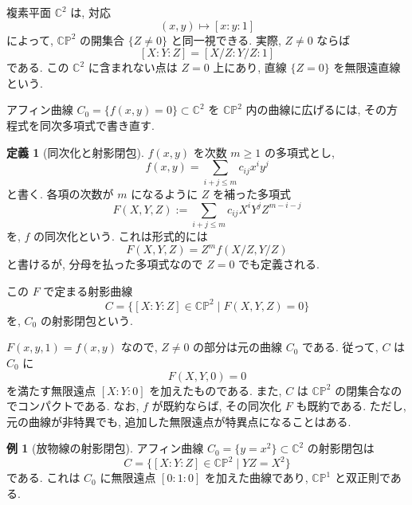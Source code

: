 \documentclass[dvipdfmx,a4paper,11pt]{article} %
\newcommand{\C}{\mathbb{C}}
\theoremstyle{definition}
\numberwithin{equation}{section}
\newtheorem{dfn}[thm]{定義}
\newtheorem{exa}[thm]{例}
\begin{document}
複素平面 $\C^2$ は, 対応
\[
(x,y)\longmapsto[x:y:1]
\]
によって, $\C\mathbb P^2$ の開集合 $\{Z\neq0\}$ と同一視できる.
実際, $Z\neq0$ ならば
\[
[X:Y:Z]=[X/Z:Y/Z:1]
\]
である.
この $\C^2$ に含まれない点は $Z=0$ 上にあり, 
直線 $\{Z=0\}$ を無限遠直線という.

アフィン曲線 $C_0=\{f(x,y)=0\}\subset\C^2$ を
$\C\mathbb P^2$ 内の曲線に広げるには, 
その方程式を同次多項式で書き直す.

\begin{dfn}[同次化と射影閉包]
$f(x,y)$ を次数 $m\geq1$ の多項式とし, 
\[
f(x,y)=\sum_{i+j\leq m}c_{ij}x^iy^j
\]
と書く.
各項の次数が $m$ になるように $Z$ を補った多項式
\[
F(X,Y,Z)
:=\sum_{i+j\leq m}c_{ij}X^iY^jZ^{m-i-j}
\]
を, $f$ の同次化という.
これは形式的には
\[
F(X,Y,Z)=Z^m f(X/Z,Y/Z)
\]
と書けるが, 分母を払った多項式なので $Z=0$ でも定義される.

この $F$ で定まる射影曲線
\[
C=\{[X:Y:Z]\in\C\mathbb P^2\mid F(X,Y,Z)=0\}
\]
を, $C_0$ の射影閉包という.
\end{dfn}

$F(x,y,1)=f(x,y)$ なので, $Z\neq0$ の部分は元の曲線 $C_0$ である.
従って, $C$ は $C_0$ に
\[
F(X,Y,0)=0
\]
を満たす無限遠点 $[X:Y:0]$ を加えたものである.
また, $C$ は $\C\mathbb P^2$ の閉集合なのでコンパクトである.
なお, $f$ が既約ならば, その同次化 $F$ も既約である.
ただし, 元の曲線が非特異でも, 
追加した無限遠点が特異点になることはある. 


\begin{exa}[放物線の射影閉包]
アフィン曲線 $C_0=\{y=x^2\}\subset\C^2$ の射影閉包は
\[
C=\{[X:Y:Z]\in\C\mathbb P^2\mid YZ=X^2\}
\]
である.
これは $C_0$ に無限遠点 $[0:1:0]$ を加えた曲線であり, 
$\C\mathbb P^1$ と双正則である.
\end{exa}
\end{document}
